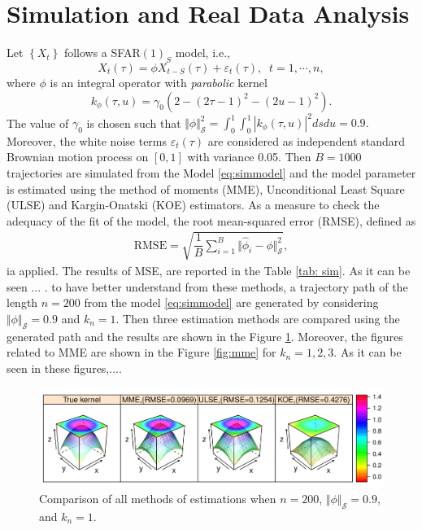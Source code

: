 \documentclass[11pt,a4paper]{article}
\numberwithin{equation}{section}
\begin{document}

\section{Simulation and Real Data Analysis}\label{sec:simulation}

Let $\left\{X_t\right\}$ follows a  SFAR$(1)_S$ model, i.e., 
\begin{equation}
\label{eq:simmodel}
X_t\left(\tau\right)=\phi X_{t-S}\left(\tau\right)+\varepsilon_t\left(\tau\right),\;\;t=1,\cdots, n,
\end{equation}
where $\phi$ is an integral operator with \textit{parabolic} kernel
\begin{equation*}
\label{eq:parabolic}
k_\phi\left(\tau,u\right)=\gamma_0\left(2-\left(2\tau-1\right)^2-\left(2u-1\right)^2\right).
\end{equation*}
The value of  $\gamma_0$ is chosen such that {\color{red}$\Vert \phi \Vert_\mathcal{S}^2=\int_0^1\int_0^1\left|k_\phi\left(\tau,u\right)\right|^2ds du=0.9.$} Moreover, the white noise terms $\varepsilon_t\left(\tau\right)$ are considered as independent standard Brownian motion process on $\left[0, 1\right]$ with variance 0.05. Then $B=1000$ trajectories are simulated from the Model \eqref{eq:simmodel} and the model parameter is estimated using the method of moments (MME), Unconditional Least Square (ULSE) and Kargin-Onatski (KOE) estimators. As a measure to check the adequacy of the fit of the model, the root mean-squared error (RMSE), defined as
\begin{align}
  \text{RMSE} = \sqrt{\dfrac{1}{B}\sum_{i=1}^B \Vert \hat{\phi}_i -\phi \Vert_\mathcal{S}^2},
\end{align} ia applied.
The results of MSE, are reported in the Table \ref{tab: sim}. As it can be seen ... . to have better understand from these methods, a trajectory path of the length $n=200$ from the model \eqref{eq:simmodel} are generated by considering $\Vert \phi\Vert_\mathcal{S}=0.9$ and $k_n=1.$ Then three estimation methods are compared using the generated path and the results are shown in the Figure \ref{fig:compare}. Moreover, the figures related to MME are shown in the Figure \ref{fig:mme} for $k_n=1, 2, 3$. As it can be seen in these figures,....

\begin{figure}[hb]
\centering
\includegraphics[width=\textwidth]{images/all_methods.png}
\caption{Comparison of all methods of estimations when $n=200$, $\Vert \phi\Vert_\mathcal{S}=0.9$, and $k_n=1$.
\label{fig:compare}}
\end{figure}
\end{document}
